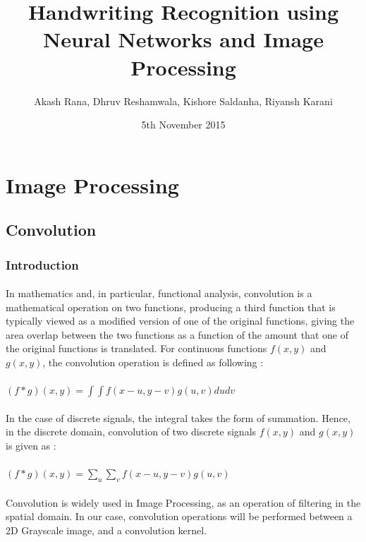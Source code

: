 \documentclass{article}
\title{Handwriting Recognition using Neural Networks and Image Processing}
\date{5th November 2015}
\author{Akash Rana,
		 Dhruv Reshamwala,
		 Kishore Saldanha,
		 Riyansh Karani}
\begin{document}
	\maketitle	
	\newpage
	\section{Image Processing}
	\subsection{Convolution}

		\subsubsection{Introduction}
			\paragraph{}
			In mathematics and, in particular, functional analysis, convolution is a mathematical operation on two functions, producing a third function that is typically viewed as a modified version of one of the original functions, giving the area overlap between the two functions as a function of the amount that one of the original functions is translated. For continuous functions $f(x,y)$ and $g(x,y)$, the convolution operation is defined as following :\\ \\ 
			$(f*g)(x,y) = \int\int f(x-u,y-v) g(u,v) du dv$
		
			\paragraph{}
			In the case of discrete signals, the integral takes the form of summation. Hence, in the discrete domain, convolution of two discrete signals $f(x,y)$ and $g(x,y)$ is given as : \\ \\
			$(f*g)(x,y) = \sum_{u}\sum_{v}f(x-u,y-v)g(u,v)$

			\paragraph{}
			Convolution is widely used in Image Processing, as an operation of filtering in the spatial domain. In our case, convolution operations will be performed between a 2D Grayscale image, and a convolution kernel.
\end{document}
